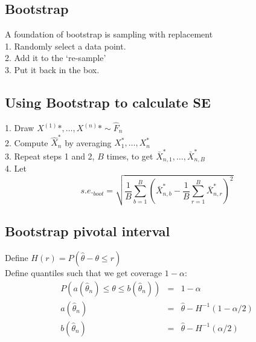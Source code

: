 \documentclass[12pt,a4paper]{article}
\begin{document}
\subsection*{Bootstrap}
A foundation of bootstrap is sampling with replacement\\
1. Randomly select a data point.\\
2. Add it to the `re-sample'\\
3. Put it back in the box.\\
\subsection*{Using Bootstrap to calculate SE}
1. Draw $X^{(1)}*,\ldots,X^{(n)}*\sim \hat F_n$\\
2. Compute $\hat X_n^*$ by averaging $X_1^*,\ldots,X_n^*$\\
3. Repeat steps 1 and 2, $B$ times, to get $\bar X_{n,1}^*,\ldots,\bar X_{n,B}^*$\\
4. Let 
$$
s.e._{boot} = \sqrt{\frac{1}{B}\sum_{b=1}^{B}\left(\bar X_{n,b}^*-\frac{1}{B}\sum_{r=1}^{B}\bar X_{n,r}^*\right)^2}
$$
\subsection*{Bootstrap pivotal interval}
Define $H(r)=P(\hat \theta-\theta\le r)$ \\
Define quantiles such that we get coverage $1-\alpha$:
\begin{eqnarray*}
P(a(\hat \theta_n)\le \theta \le b(\hat \theta_n)) &=& 1-\alpha\\
a(\hat \theta_n) &=&\hat \theta -H^{-1}(1-\alpha/2)\\
b(\hat \theta_n) &=& \hat \theta-H^{-1}(\alpha/2)\\
\end{eqnarray*}
\end{document}
